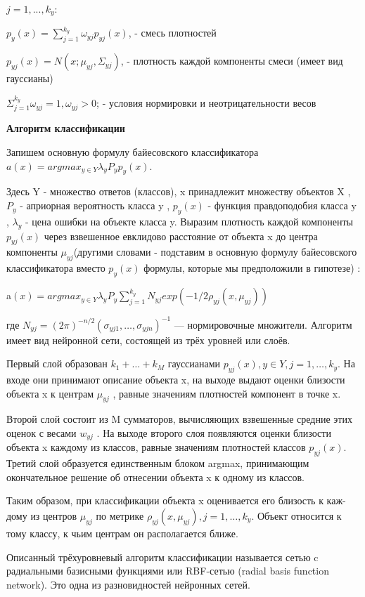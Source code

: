 $j = 1, . . . , k_y$:

 $p_y(x) = \sum ^{k _y} _{j = 1} \omega _{yj} p _{yj}(x)$,  - смесь плотностей

$p_{yj}(x) = N(x; \mu _{yj} ,\Sigma _{yj})$,  - плотность каждой компоненты смеси (имеет вид гауссианы)

 $\Sigma ^{k_y} _{j = 1} \omega _{yj} = 1, \omega _{yj} > 0$; - условия нормировки и неотрицательности весов

\textbf{Алгоритм классификации}

Запишем основную формулу байесовского классификатора $a(x) = argmax _{y \in Y} \lambda _y P _y p_y(x)$.

Здесь Y - множество ответов (классов), x принадлежит множеству объектов X , $P_y$ - априорная вероятность класса y , $p_y(x)$ - функция правдоподобия класса y , $\lambda_{y}$ - цена ошибки на объекте класса y. Выразим плотность каждой компоненты $p_{yj}(x)$ через взвешенное евклидово расстояние от объекта x до центра компоненты $\mu _{yj}$(другими словами - подставим в основную формулу байесовского классификатора вместо $p_y(x)$ формулы, которые мы предположили в гипотезе) :


a$(x) = argmax _{y \in Y} \lambda _y P _y \sum ^{k_y} _{j = 1} N _{yj} exp(-1/2 \rho  _{yj} (x, \mu _{yj}))$


где $N _{yj} = (2\pi)^{-n/2} (\sigma _{yj1},\dots , \sigma _{yjn})^{-1}$ — нормировочные множители. Алгоритм имеет вид нейронной сети, состоящей из трёх уровней или слоёв.

Первый слой образован $k_1 + \dots+ k_M$ гауссианами $p_{yj}(x), y \in Y , j = 1, \dots, k_y$. На входе они принимают описание объекта x, на выходе выдают оценки близости объекта x к центрам $\mu _{yj}$ , равные значениям плотностей компонент в точке x.

Второй слой состоит из M сумматоров, вычисляющих взвешенные средние этих оценок с весами $w_{yj}$ . На выходе второго слоя появляются оценки близости объекта x каждому из классов, равные значениям плотностей классов $p_{yj}(x)$.
Третий слой образуется единственным блоком argmax, принимающим окончательное решение об отнесении объекта x к одному из классов.

Таким образом, при классификации объекта x оценивается его близость к каж- дому из центров $\mu _{yj}$ по метрике $\rho _{yj}(x, \mu _{yj}), j = 1, \dots, k_y$. Объект относится к тому классу, к чьим центрам он располагается ближе.

Описанный трёхуровневый алгоритм классификации называется сетью c радиальными базисными функциями или RBF-сетью (radial basis function network). Это одна из разновидностей нейронных сетей.

